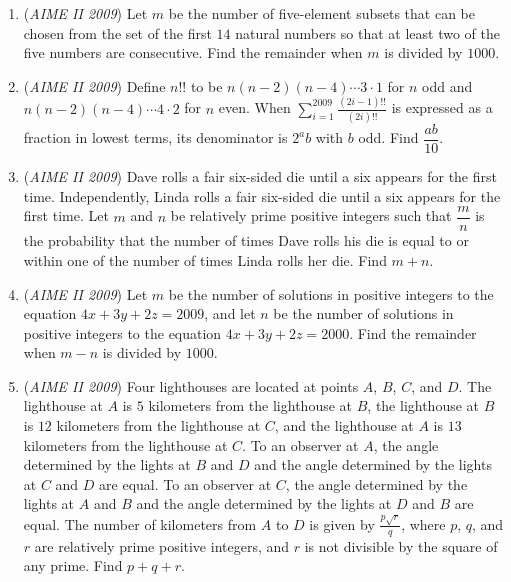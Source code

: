 \begin{enumerate}
	\item (\textit{AIME II 2009}) Let $m$ be the number of five-element subsets that can be chosen from the set of the first $14$ natural numbers so that at least two of the five numbers are consecutive. Find the remainder when $m$ is divided by $1000$.


 

	\item (\textit{AIME II 2009}) Define $n!!$ to be $n(n-2)(n-4)\cdots 3\cdot 1$ for $n$ odd and $n(n-2)(n-4)\cdots 4\cdot 2$ for $n$ even. When $\sum_{i=1}^{2009} \frac{(2i-1)!!}{(2i)!!}$ is expressed as a fraction in lowest terms, its denominator is $2^ab$ with $b$ odd. Find $\dfrac{ab}{10}$.


 

	\item (\textit{AIME II 2009}) Dave rolls a fair six-sided die until a six appears for the first time. Independently, Linda rolls a fair six-sided die until a six appears for the first time. Let $m$ and $n$ be relatively prime positive integers such that $\dfrac mn$ is the probability that the number of times Dave rolls his die is equal to or within one of the number of times Linda rolls her die. Find $m+n$.


 

	\item (\textit{AIME II 2009}) Let $m$ be the number of solutions in positive integers to the equation $4x+3y+2z=2009$, and let $n$ be the number of solutions in positive integers to the equation $4x+3y+2z=2000$. Find the remainder when $m-n$ is divided by $1000$.


 

	\item (\textit{AIME II 2009}) Four lighthouses are located at points $A$, $B$, $C$, and $D$. The lighthouse at $A$ is $5$ kilometers from the lighthouse at $B$, the lighthouse at $B$ is $12$ kilometers from the lighthouse at $C$, and the lighthouse at $A$ is $13$ kilometers from the lighthouse at $C$. To an observer at $A$, the angle determined by the lights at $B$ and $D$ and the angle determined by the lights at $C$ and $D$ are equal. To an observer at $C$, the angle determined by the lights at $A$ and $B$ and the angle determined by the lights at $D$ and $B$ are equal. The number of kilometers from $A$ to $D$ is given by $\frac{p\sqrt{r}}{q}$, where $p$, $q$, and $r$ are relatively prime positive integers, and $r$ is not divisible by the square of any prime. Find $p+q+r$.



\end{enumerate}
